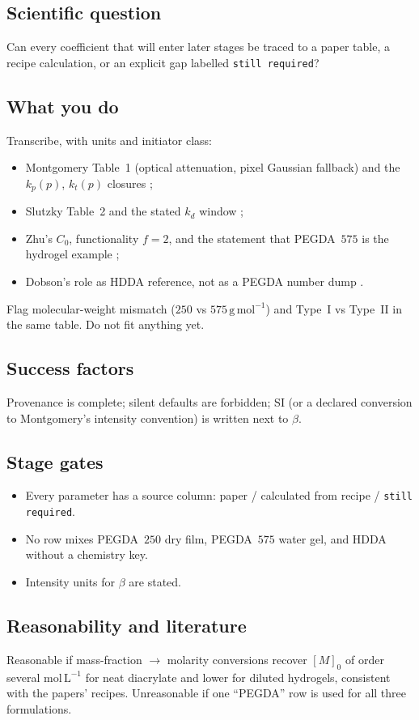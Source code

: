\documentclass[11pt,a4paper]{article}
\newcommand{\stillreq}{\texttt{still required}}
\begin{document}
\subsection{Scientific question}
Can every coefficient that will enter later stages be traced to a paper table, a recipe calculation, or an explicit gap labelled \stillreq?

\subsection{What you do}
Transcribe, with units and initiator class:
\begin{itemize}
  \item Montgomery Table~1 (optical attenuation, pixel Gaussian fallback) and the $k_p(p)$, $k_t(p)$ closures \citep{Montgomery2022};
  \item Slutzky Table~2 and the stated $k_d$ window \citep{Slutzky2019};
  \item Zhu's $C_0$, functionality $f=2$, and the statement that PEGDA~$575$ is the hydrogel example \citep{Zhu2020};
  \item Dobson's role as HDDA reference, not as a PEGDA number dump \citep{Dobson2024}.
\end{itemize}
Flag molecular-weight mismatch ($250$ vs $575\,\mathrm{g\,mol^{-1}}$) and Type~I vs Type~II in the same table.
Do not fit anything yet.

\subsection{Success factors}
Provenance is complete; silent defaults are forbidden; SI (or a declared conversion to Montgomery's intensity convention) is written next to $\beta$.

\subsection{Stage gates}
\begin{itemize}
  \item Every parameter has a source column: paper / calculated from recipe / \stillreq.
  \item No row mixes PEGDA~$250$ dry film, PEGDA~$575$ water gel, and HDDA without a chemistry key.
  \item Intensity units for $\beta$ are stated.
\end{itemize}

\subsection{Reasonability and literature}
Reasonable if mass-fraction $\to$ molarity conversions recover $[M]_0$ of order several $\mathrm{mol\,L^{-1}}$ for neat diacrylate and lower for diluted hydrogels, consistent with the papers' recipes.
Unreasonable if one ``PEGDA'' row is used for all three formulations.
\end{document}
